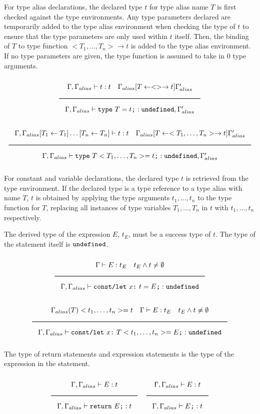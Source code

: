 For type alias declarations, the declared type $t$ for type alias name $T$ is first checked against the type environments.
Any type parameters declared are temporarily added to the type alias environment when checking the type of $t$
to ensure that the type parameters are only used within $t$ itself.
Then, the binding of $T$ to type function $<T_1, \ldots, T_n> \rightarrow t$ is added to the type alias environment.
If no type parameters are given, the type function is assumed to take in 0 type arguments.

\noindent
\[
  \Rule{\Gamma, \Gamma_{alias} \vdash t : t \quad \Gamma_{alias} [T \leftarrow <> \rightarrow t] \Gamma'_{alias}
    }{\Gamma, \Gamma_{alias} \vdash \texttt{type}\ T = t \texttt{;} : \Undefined, \Gamma'_{alias}}
\]
\noindent
\[
  \Rule{\Gamma, \Gamma_{alias}[T_1 \leftarrow T_1]\ldots[T_n \leftarrow T_n] \vdash t : t \quad
    \Gamma_{alias} [T \leftarrow <T_1, \ldots, T_n> \rightarrow t] \Gamma'_{alias}
    }{\Gamma, \Gamma_{alias} \vdash \texttt{type}\ T<T_1, \ldots, T_n> = t \texttt{;} : \Undefined, \Gamma'_{alias}}
\]
\noindent

For constant and variable declarations, the declared type $t$ is retrieved from the type environment.
If the declared type is a type reference to a type alias with name $T$,
$t$ is obtained by applying the type arguments $t_1, \ldots, t_n$ to the type function for $T$,
replacing all instances of type variables $T_1, \ldots, T_n$ in $t$ with $t_1, \ldots, t_n$ respectively.

The derived type of the expression $E$, $t_E$, must be a success type of $t$.
The type of the statement itself is $\texttt{undefined}$.

\noindent
\[
  \Rule{\Gamma \vdash E : t_E \quad t_E \wedge t \neq \emptyset}{
    \Gamma, \Gamma_{alias} \vdash \texttt{const/let}\ x \texttt{:}\ t = E\texttt{;} : \Undefined}
\]
\noindent
\[
  \Rule{\Gamma_{alias}(T)<t_1, \ldots, t_n> = t \quad \Gamma \vdash E : t_E \quad t_E \wedge t \neq \emptyset
    }{\Gamma, \Gamma_{alias} \vdash \texttt{const/let}\ x \texttt{:}\ T<t_1, \ldots, t_n> = E\texttt{;} : \Undefined}
\]
\noindent

The type of return statements and expression statements is the type of the expression in the statement.

\noindent
\[
  \Rule{\Gamma, \Gamma_{alias} \vdash E : t}{\Gamma, \Gamma_{alias} \vdash \texttt{return}\ E\texttt{;} : t}
  \quad
  \Rule{\Gamma, \Gamma_{alias} \vdash E : t}{\Gamma, \Gamma_{alias} \vdash E\texttt{;} : t}
\]
\noindent

